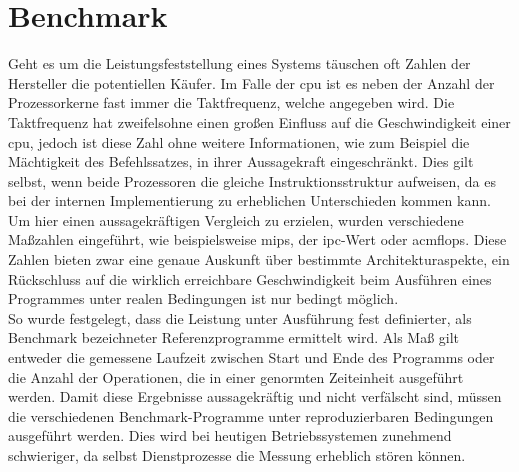 \section{Benchmark}\label{kap:benchmark}
Geht es um die Leistungsfeststellung eines Systems täuschen oft Zahlen der Hersteller die potentiellen Käufer. Im Falle der \ac{cpu} ist es neben der Anzahl der Prozessorkerne
 fast immer die Taktfrequenz, welche angegeben wird.
Die Taktfrequenz hat zweifelsohne einen großen Einfluss auf die Geschwindigkeit einer \ac{cpu}, jedoch ist diese Zahl ohne weitere Informationen, wie zum Beispiel die
Mächtigkeit des Befehlssatzes, in ihrer Aussagekraft eingeschränkt. Dies gilt selbst, wenn beide Prozessoren die gleiche Instruktionsstruktur aufweisen, da es bei der
internen Implementierung zu erheblichen Unterschieden kommen kann. \\
Um hier einen aussagekräftigen Vergleich zu erzielen, wurden verschiedene Maßzahlen eingeführt, wie beispielsweise \ac{mips}, der \ac{ipc}-Wert oder ac{mflops}. Diese
 Zahlen bieten zwar eine genaue Auskunft über bestimmte Architekturaspekte, ein Rückschluss auf die wirklich erreichbare Geschwindigkeit beim Ausführen eines Programmes
 unter realen Bedingungen ist nur bedingt möglich. \\
So wurde festgelegt, dass die Leistung unter Ausführung fest definierter, als Benchmark bezeichneter Referenzprogramme ermittelt wird. Als Maß gilt entweder die gemessene
 Laufzeit zwischen Start und Ende des Programms oder die Anzahl der Operationen, die in einer genormten Zeiteinheit ausgeführt werden. Damit diese Ergebnisse aussagekräftig
 und nicht verfälscht sind, müssen die verschiedenen Benchmark-Programme unter reproduzierbaren Bedingungen ausgeführt werden. Dies wird bei heutigen Betriebssystemen zunehmend
  schwieriger, da selbst Dienstprozesse die Messung erheblich stören können.~\cite{benchmark}


